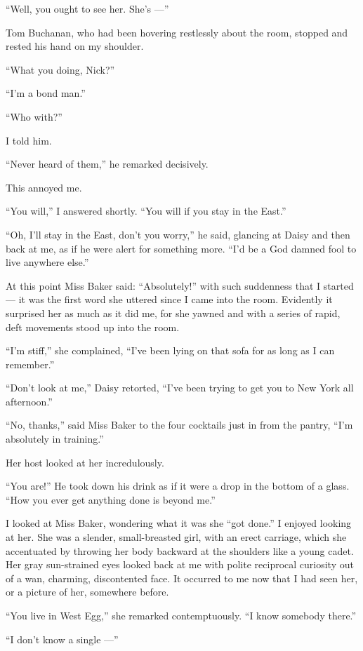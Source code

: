 \documentclass{znotebook}
\begin{document}
``Well, you ought to see her. She's ---''

Tom Buchanan, who had been hovering restlessly about the room, stopped and rested his hand on my shoulder.

``What you doing, Nick?''

``I'm a bond man.''

``Who with?''

I told him.

``Never heard of them,'' he remarked decisively.

This annoyed me.

``You will,'' I answered shortly. ``You will if you stay in the East.''

``Oh, I'll stay in the East, don't you worry,'' he said, glancing at Daisy and then back at me, as if he were alert for something more. ``I'd be a God damned fool to live anywhere else.''

At this point Miss Baker said: ``Absolutely!'' with such suddenness that I started ---{} it was the first word she uttered since I came into the room. Evidently it surprised her as much as it did me, for she yawned and with a series of rapid, deft movements stood up into the room.

``I'm stiff,'' she complained, ``I've been lying on that sofa for as long as I can remember.''

``Don't look at me,'' Daisy retorted, ``I've been trying to get you to New York all afternoon.''

``No, thanks,'' said Miss Baker to the four cocktails just in from the pantry, ``I'm absolutely in training.''

Her host looked at her incredulously.

``You are!'' He took down his drink as if it were a drop in the bottom of a glass. ``How you ever get anything done is beyond me.''

I looked at Miss Baker, wondering what it was she ``got done.'' I enjoyed looking at her. She was a slender, small-breasted girl, with an erect carriage, which she accentuated by throwing her body backward at the shoulders like a young cadet. Her gray sun-strained eyes looked back at me with polite reciprocal curiosity out of a wan, charming, discontented face. It occurred to me now that I had seen her, or a picture of her, somewhere before.

``You live in West Egg,'' she remarked contemptuously. ``I know somebody there.''

``I don't know a single ---''
\end{document}
